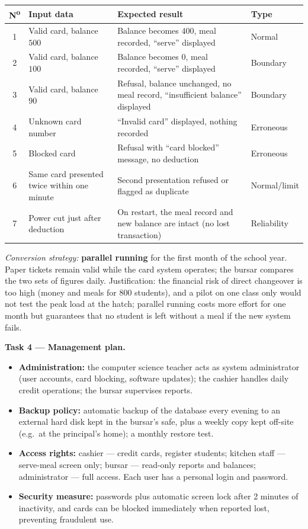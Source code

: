 \documentclass[11pt]{article}
\begin{document}
\begin{center}
\begin{tabularx}{\linewidth}{|c|X|X|l|}
\hline
\rowcolor{popblueL} \textbf{N\textsuperscript{o}} & \textbf{Input data} & \textbf{Expected result} & \textbf{Type} \\
\hline
1 & Valid card, balance $500$ & Balance becomes $400$, meal recorded, ``serve'' displayed & Normal \\
\hline
2 & Valid card, balance $100$ & Balance becomes $0$, meal recorded, ``serve'' displayed & Boundary \\
\hline
3 & Valid card, balance $90$ & Refusal, balance unchanged, no meal record, ``insufficient balance'' displayed & Boundary \\
\hline
4 & Unknown card number & ``Invalid card'' displayed, nothing recorded & Erroneous \\
\hline
5 & Blocked card & Refusal with ``card blocked'' message, no deduction & Erroneous \\
\hline
6 & Same card presented twice within one minute & Second presentation refused or flagged as duplicate & Normal/limit \\
\hline
7 & Power cut just after deduction & On restart, the meal record and new balance are intact (no lost transaction) & Reliability \\
\hline
\end{tabularx}
\end{center}

\emph{Conversion strategy:} \textbf{parallel running} for the first month of the school year. Paper tickets remain valid while the card system operates; the bursar compares the two sets of figures daily. Justification: the financial risk of direct changeover is too high (money and meals for $800$ students), and a pilot on one class only would not test the peak load at the hatch; parallel running costs more effort for one month but guarantees that no student is left without a meal if the new system fails.

\textbf{Task 4 — Management plan.}

\begin{itemize}
\item \textbf{Administration:} the computer science teacher acts as system administrator (user accounts, card blocking, software updates); the cashier handles daily credit operations; the bursar supervises reports.
\item \textbf{Backup policy:} automatic backup of the database every evening to an external hard disk kept in the bursar's safe, plus a weekly copy kept off-site (e.g.\ at the principal's home); a monthly restore test.
\item \textbf{Access rights:} cashier --- credit cards, register students; kitchen staff --- serve-meal screen only; bursar --- read-only reports and balances; administrator --- full access. Each user has a personal login and password.
\item \textbf{Security measure:} passwords plus automatic screen lock after 2 minutes of inactivity, and cards can be blocked immediately when reported lost, preventing fraudulent use.
\end{itemize}
\end{document}
